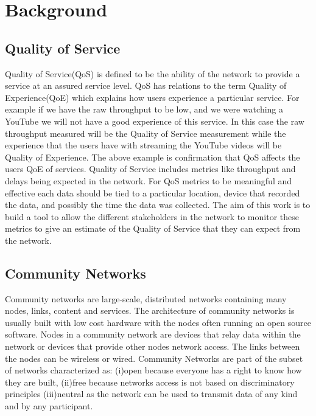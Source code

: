 \section{Background}\label{sec:background}
\subsection{Quality of Service}\label{subsec:quality-of-services}
Quality of Service(QoS) is defined to be the ability of the network to provide a service at an assured service level\cite{soldani_book}.
QoS has relations to the term Quality of Experience(QoE) which explains how users experience a particular service\cite{6462223}.
For example if we have the raw throughput to be low, and we were watching a YouTube we will not have a good experience of this service.
In this case the raw throughput measured will be the Quality of Service measurement while the experience that the users have with streaming the YouTube videos will be Quality of Experience.
The above example is confirmation that QoS affects the users QoE of services.
Quality of Service includes metrics like throughput and delays being expected in the network.
For QoS metrics to be meaningful and effective each data should be tied to a particular location, device that recorded the data, and possibly the time the data was collected.
The aim of this work is to build a tool to allow the different stakeholders in the network to monitor these metrics to give an estimate of the Quality of Service that they can expect from the network.

\subsection{Community Networks}\label{subsec:community-networks}
Community networks are large-scale, distributed networks containing many nodes, links, content and services\cite{Braem:2013:CRC:2500098.2500108}.
The architecture of community networks is usually built with low cost hardware with the nodes often running an open source software\cite{Braem:2013:CRC:2500098.2500108}.
Nodes in a community network are devices that relay data within the network or devices that provide other nodes network access\cite{8320771}.
The links between the nodes can be wireless or wired\cite{8320771}.
Community Networks are part of the subset of networks characterized as:
(i)open because everyone has a right to know how they are built,
(ii)free because networks access is not based on discriminatory principles
(iii)neutral as the network can be used to transmit data of any kind and by any participant\cite{Braem:2015:AEQ:2830629.2830639}.

